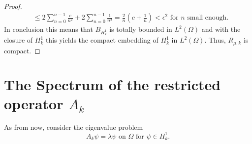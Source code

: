 \begin{theorem}
\begin{proof}
\begin{align*}
				& \leq 2 \sum_{n = 0}^{n-1} \frac{c}{n^{2}} + 2 \sum_{n=0}^{n-1} \frac{1}{n^{3}} = \frac{2}{n} \left( c + \frac{1}{n} \right) < \epsilon^{2} \text{ for } n \text{ small enough.}
		\end{align*}		 
	In conclusion this means that $B_{H^{1}_{k}}$ is totally bounded in $L^{2}(\Omega)$ and with the closure of $H^{1}_{k}$ this yields the compact embedding of $H^{1}_{k}$ in $L^{2}(\Omega)$. Thus, $R_{\mu, k}$ is compact.
	\end{proof}	
\end{theorem}		

\section{The Spectrum of the restricted operator \texorpdfstring{$A_{k}$}{Ak}}		
As from now, consider the eigenvalue problem
	\begin{equation}
		A_{k} \psi = \lambda \psi \text{ on } \Omega \text{ for } \psi \in H^{1}_{k}. \label{eigv-problem}
	\end{equation}
	
